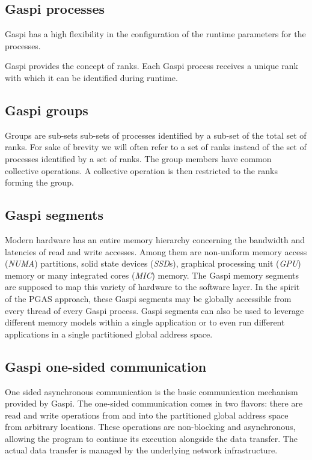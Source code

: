 \documentclass{article}
\newlength{\st}\setlength{\st}{0pt}
\newcommand{\GASPI}{{\sc Gaspi}}
\begin{document}
\subsection{\GASPI{} processes}

\GASPI{} has a high flexibility in the configuration of the runtime
parameters for the processes.

\GASPI{} provides the concept of ranks. Each \GASPI{} process receives
a unique rank with which it can be identified during runtime.

\subsection{\GASPI{} groups}

Groups are sub-sets sub-sets of processes identified by a sub-set of the total set of ranks. For sake of brevity we will often refer to a set of ranks instead of the set of processes identified by a set of ranks.  The group members
have common collective operations. A collective operation is then
restricted to the ranks forming the group.

\subsection{\GASPI{} segments}

Modern hardware has an entire memory hierarchy concerning the
bandwidth and latencies of read and write accesses. Among them are
non-uniform memory access (\emph{NUMA}) partitions, solid state
devices (\emph{SSD}s), graphical processing unit (\emph{GPU}) memory
or many integrated cores (\emph{MIC}) memory.  The \GASPI{} memory
segments are supposed to map this variety of hardware to the software
layer. In the spirit of the PGAS approach, these \GASPI{} segments
may be globally accessible from every thread of every \GASPI{} process.
\GASPI{} segments can also be used to leverage different memory models within
a single application or to even run different applications in a single partitioned global 
address space.

\subsection{\GASPI{} one-sided communication}

One sided asynchronous communication is the basic communication
mechanism provided by \GASPI{}. The one-sided communication comes
in two flavors: there are read and write operations from and into the
partitioned global address space from arbitrary locations. These
operations are non-blocking and asynchronous, allowing the program to continue
its execution alongside the data transfer. The actual data transfer is managed
by the underlying network infrastructure.
\end{document}
